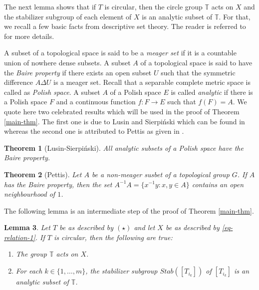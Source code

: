 \documentclass[10pt,a4paper]{amsart}
\newtheorem{theorem}{Theorem}[section]
\newtheorem{lemma}[theorem]{Lemma}%
\begin{document}
The next lemma shows that if $T$ is circular, then the circle group $\mathbb T$ acts on $X$ and the stabilizer subgroup of each element of $X$ is an analytic subset of $\mathbb T$. For that, we recall a few basic facts from descriptive set theory. The reader is referred to \cite{K} for more details.

A subset of a topological space is said to be a {\it meager set} if it is a countable union of nowhere dense subsets. A  subset $A$ of a topological space is said to have the {\it Baire property} if there exists an open subset $U$ such that the symmetric difference $A \Delta U$ is a meager set. Recall that a separable complete metric space is called as {\it Polish space}. A subset $A$ of a Polish space $E$ is called {\it analytic} if there is a Polish space $F$ and a continuous function $f : F \to E$ such that $f(F) = A$. We quote here two celebrated results which will be used in the proof of Theorem \ref{main-thm}. The first one is due to Lusin and Sierpi\'nski which can be found in \cite[Theorem 21.6, Pg 153]{K} whereas the second one is attributed to Pettis as given in \cite[Theorem 9.9, Pg 61]{K}. 

\begin{theorem}[Lusin-Sierpi\'nski]\label{LST}
All analytic subsets of a Polish space have the Baire property.
\end{theorem}     

\begin{theorem}[Pettis]\label{PT}
Let $A$ be a non-meager susbet of a topological group $G$. If $A$ has the Baire property, then the set $A^{-1}A = \{x^{-1}y : x, y \in A\}$ contains an open neighbourhood of $1$.
\end{theorem}

The following lemma is an intermediate step of the proof of Theorem \ref{main-thm}.

\begin{lemma}\label{grp-action}
Let $T$ be as described by $(\star)$ and let $X$ be as described by \eqref{eq-relation-1}. If $T$ is circular, then the following are true:
\begin{enumerate}
\item[(i)] The group $\mathbb T$ acts on $X$.
\item[(ii)] For each $k \in  \{1, \ldots, m\}$, the stabilizer subgroup $Stab([T_{i_k}])$ of $[T_{i_k}]$ is an analytic subset of $\mathbb T$. 
\end{enumerate}  
\end{lemma}
\end{document}
